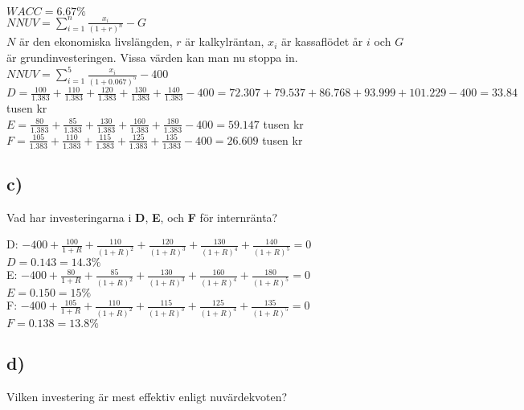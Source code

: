 \documentclass[a4paper, titlepage,12pt]{article}
\begin{document}
			$WACC = 6.67\%$\\

			$NNUV = \sum_{i=1}^{n} \frac{x_i}{(1 + r)^n} - G$ \\

			$N$ är den ekonomiska livslängden, $r$ är kalkylräntan, $x_i$ är kassaflödet år $i$ och $G$ är grundinvesteringen. Vissa värden kan man nu stoppa in.\\

			$NNUV = \sum_{i=1}^{5} \frac{x_i}{(1+0.067)^5} - 400$\\

			$D = \frac{100}{1.383} + \frac{110}{1.383} + \frac{120}{1.383} + \frac{130}{1.383} + \frac{140}{1.383} - 400 = 72.307 + 79.537 + 86.768 + 93.999 + 101.229 - 400 = 33.84$ tusen kr\\

			$E = \frac{80}{1.383} + \frac{85}{1.383} + \frac{130}{1.383} + \frac{160}{1.383} + \frac{180}{1.383} - 400 = 59.147$ tusen kr\\

			$F = \frac{105}{1.383} + \frac{110}{1.383} + \frac{115}{1.383} + \frac{125}{1.383} + \frac{135}{1.383} - 400 = 26.609$ tusen kr\\

		\subsection*{c)} Vad har investeringarna i \textbf{D}, \textbf{E}, och \textbf{F} för internränta?
		
			D: $-400 + \frac{100}{1 + R} + \frac{110}{(1 + R)^2} + \frac{120}{(1 + R)^3} + \frac{130}{(1 + R)^4} + \frac{140}{(1 + R)^5} = 0$\\

			$D = 0.143 = 14.3\%$\\

			E: $-400 + \frac{80}{1 + R} + \frac{85}{(1 + R)^2} + \frac{130}{(1 + R)^3} + \frac{160}{(1 + R)^4} + \frac{180}{(1 + R)^5} = 0$\\

			$E = 0.150 = 15\%$\\

			F: $-400 + \frac{105}{1 + R} + \frac{110}{(1 + R)^2} + \frac{115}{(1 + R)^3} + \frac{125}{(1 + R)^4} + \frac{135}{(1 + R)^5} = 0$\\

			$F = 0.138 = 13.8\%$\\

		\subsection*{d)} Vilken investering är mest effektiv enligt nuvärdekvoten?\\
\end{document}
